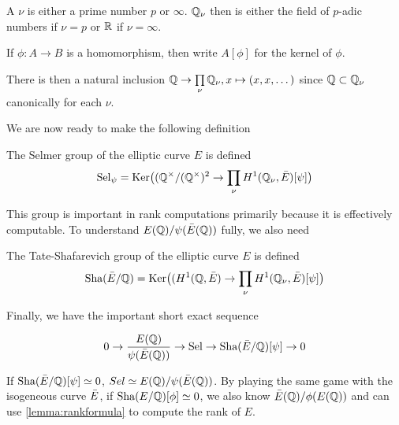 \documentclass[12pt, a4paper]{amsart}
\begin{document}
\begin{defn}
  A  $\nu$ is either a prime number $p$ or $\infty$. ${\mathbb Q}_\nu$ then is
  either the field of $p$-adic numbers if $\nu = p$ or ${\mathbb R}$ if $\nu = \infty$.
\end{defn}

\begin{defn}
  If $\phi: A \rightarrow B$ is a homomorphism, then write $A[\phi]$ for the
  kernel of $\phi$.
\end{defn}

There is then a natural inclusion ${\mathbb Q} \rightarrow \prod\limits_\nu {\mathbb Q}_\nu,
x \mapsto (x, x, \dots)$ since ${\mathbb Q} \subset {\mathbb Q}_{\nu}$ canonically for each $\nu$.


We are now ready to make the following definition

\begin{defn}
  The Selmer group of the elliptic curve $E$ is defined
  $$\text{\normalfont Sel}_\psi = \text{Ker}\big(({\mathbb Q}^{\times}/({\mathbb Q}^{\times})^2 \rightarrow
  \prod\limits_\nu H^1({\mathbb Q}_\nu, \bar{E})[\psi]\big)$$
\end{defn}

This group is important in rank computations primarily because it is effectively
computable. To understand $E({\mathbb Q})/\psi(\bar{E}({\mathbb Q}))$ fully, we also need

\begin{defn} \label{defn:sha}
  The Tate-Shafarevich group of the elliptic curve $E$ is defined
  $$ \text{\normalfont Sha}(\bar{E} / {\mathbb Q}) = \text{Ker} \big((H^1({\mathbb Q}, \bar{E}) \rightarrow \prod\limits_\nu H^1 ({\mathbb Q}_\nu,
  \bar{E})[\psi]\big) $$
\end{defn}

Finally, we have the important short exact sequence

\[ 0 \rightarrow \frac{E({\mathbb Q})}{\psi(\bar{E}({\mathbb Q}))} \rightarrow \text{\normalfont Sel} \rightarrow \text{\normalfont Sha}(\bar{E}/{\mathbb Q})[\psi] \rightarrow 0\]

If $\text{\normalfont Sha}(\bar{E}/{\mathbb Q})[\psi] \simeq 0$, $Sel \simeq E({\mathbb Q})/\psi(\bar{E}({\mathbb Q}))$. By playing
the same game with the isogeneous curve $\bar{E}$, if $\text{\normalfont Sha}(E/{\mathbb Q})[\phi] \simeq 0$,
we also know $\bar{E}({\mathbb Q})/\phi(E({\mathbb Q}))$ and can use \ref{lemma:rankformula} to compute
the rank of $E$. 
\end{document}
